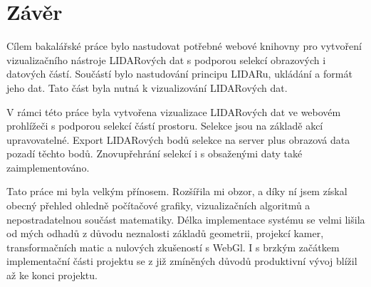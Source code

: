 \documentclass[czech,bachelor,dept420,male,cpdeclaration]{diploma}
\begin{document}
\section{Závěr}
Cílem bakalářské práce bylo nastudovat potřebné webové knihovny pro vytvoření vizualizačního nástroje LIDARových dat s podporou selekcí obrazových i datových částí. Součástí bylo nastudování principu LIDARu, ukládání a formát jeho dat. Tato část byla nutná k vizualizování LIDARových dat.

V rámci této práce byla vytvořena vizualizace LIDARových dat ve webovém prohlížeči s podporou selekcí částí prostoru. Selekce jsou na základě akcí upravovatelné. Export LIDARových bodů selekce na server plus obrazová data pozadí těchto bodů. Znovupřehrání selekcí i s obsaženými daty také zaimplementováno.

Tato práce mi byla velkým přínosem. Rozšířila mi obzor, a díky ní jsem získal obecný přehled ohledně počítačové grafiky, vizualizačních algoritmů a nepostradatelnou součást matematiky. Délka implementace systému se velmi lišila od mých odhadů z důvodu neznalosti základů geometrii, projekcí kamer, transformačních matic a nulových zkušeností s WebGl. I s brzkým začátkem implementační části projektu se z již zmíněných důvodů produktivní vývoj blížil až ke konci projektu.
 

\newpage
\nocite{*}
\renewcommand\refname{Literatura}

%
%
\printbibliography
%




% 	
%		
%
\end{document}
